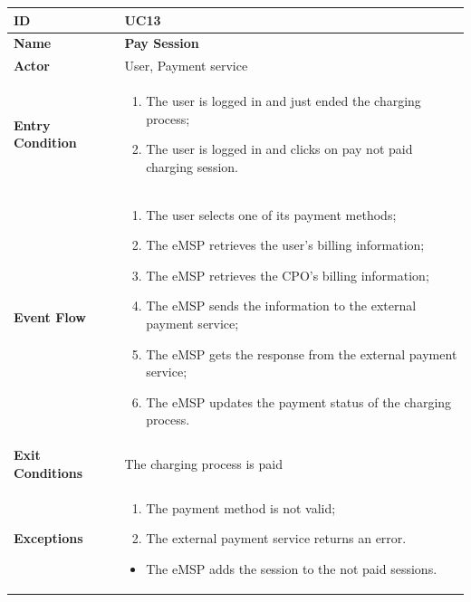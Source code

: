 \documentclass{Configuration_Files/PoliMi3i_thesis}
\begin{document}

\begin{table}[H]
    \begin{xltabular}{\textwidth}{| >{}l | X |}
    \hline
    \textbf{ID} & \textbf{UC13}\T\B\\
    \hline
    \textbf{Name} & \textbf{Pay Session}\T\B\\
    \hline \hline
    \textbf{Actor} & User, Payment service\T\B \\
    \hline
    \textbf{Entry Condition} & 
    \begin{enumerate}
        \item The user is logged in and just ended the charging process;
        \item The user is logged in and clicks on pay not paid charging session.
    \end{enumerate}\T\B\\
    \hline
    \textbf{Event Flow} & 
        \begin{enumerate}
        \item The user selects one of its payment methods;
        \item The eMSP retrieves the user’s billing information;
        \item The eMSP retrieves the CPO’s billing information;
        \item The eMSP sends the information to the external payment service;
        \item The eMSP gets the response from the external payment service;
        \item The eMSP updates the payment status of the charging process.
        \end{enumerate}\B\\
    \hline
    \textbf{Exit Conditions} & The charging process is paid\B\\
    \hline
    \textbf{Exceptions} & 
    \begin{enumerate}
        \item The payment method is not valid;
        \item The external payment service returns an error.
    \end{enumerate}
    \begin{itemize}
        \item The eMSP adds the session to the not paid sessions.
    \end{itemize}\B\\
    \hline
    \end{xltabular}
\end{table}
\end{document}
